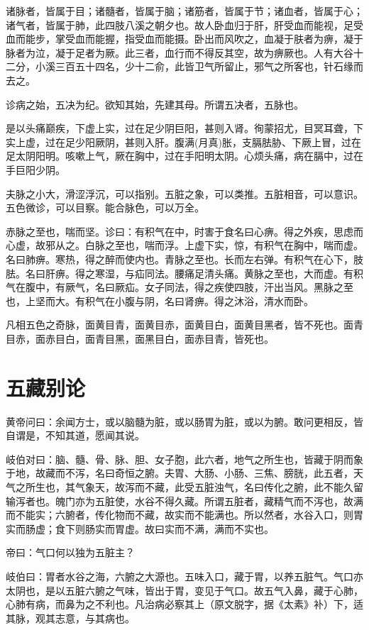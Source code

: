 \documentclass{article}%
\begin{document}
诸脉者，皆属于目；诸髓者，皆属于脑；诸筋者，皆属于节；诸血者，皆属于心；诸气者，皆属于肺，此四肢八溪之朝夕也。故人卧血归于肝，肝受血而能视，足受血而能步，掌受血而能握，指受血而能摄。卧出而风吹之，血凝于肤者为痹，凝于脉者为泣，凝于足者为厥。此三者，血行而不得反其空，故为痹厥也。人有大谷十二分，小溪三百五十四名，少十二俞，此皆卫气所留止，邪气之所客也，针石缘而去之。

诊病之始，五决为纪。欲知其始，先建其母。所谓五决者，五脉也。

是以头痛巅疾，下虚上实，过在足少阴巨阳，甚则入肾。徇蒙招尤，目冥耳聋，下实上虚，过在足少阳厥阴，甚则入肝。腹满(月真)胀，支膈胠胁、下厥上冒，过在足太阴阳明。咳嗽上气，厥在胸中，过在手阳明太阴。心烦头痛，病在膈中，过在手巨阳少阴。

夫脉之小大，滑涩浮沉，可以指别。五脏之象，可以类推。五脏相音，可以意识。五色微诊，可以目察。能合脉色，可以万全。

赤脉之至也，喘而坚。诊曰：有积气在中，时害于食名曰心痹。得之外疾，思虑而心虚，故邪从之。白脉之至也，喘而浮。上虚下实，惊，有积气在胸中，喘而虚。名曰肺痹。寒热，得之醉而使内也。青脉之至也。长而左右弹。有积气在心下，肢胠。名曰肝痹。得之寒湿，与疝同法。腰痛足清头痛。黄脉之至也，大而虚。有积气在腹中，有厥气，名曰厥疝。女子同法，得之疾使四肢，汗出当风。黑脉之至也，上坚而大。有积气在小腹与阴，名曰肾痹。得之沐浴，清水而卧。

凡相五色之奇脉，面黄目青，面黄目赤，面黄目白，面黄目黑者，皆不死也。面青目赤，面赤目白，面青目黑，面黑目白，面赤目青，皆死也。
\section{五藏别论}
黄帝问曰：余闻方士，或以脑髓为脏，或以肠胃为脏，或以为腑。敢问更相反，皆自谓是，不知其道，愿闻其说。

岐伯对曰：脑、髓、骨、脉、胆、女子胞，此六者，地气之所生也，皆藏于阴而象于地，故藏而不泻，名曰奇恒之腑。夫胃、大肠、小肠、三焦、膀胱，此五者，天气之所生也，其气象天，故泻而不藏，此受五脏浊气，名曰传化之腑，此不能久留输泻者也。魄门亦为五脏使，水谷不得久藏。所谓五脏者，藏精气而不泻也，故满而不能实；六腑者，传化物而不藏，故实而不能满也。所以然者，水谷入口，则胃实而肠虚；食下则肠实而胃虚。故曰实而不满，满而不实也。

帝曰：气口何以独为五脏主？

岐伯曰：胃者水谷之海，六腑之大源也。五味入口，藏于胃，以养五脏气。气口亦太阴也，是以五脏六腑之气味，皆出于胃，变见于气口。故五气入鼻，藏于心肺，心肺有病，而鼻为之不利也。凡治病必察其上（原文脱字，据《太素》补）下，适其脉，观其志意，与其病也。
\end{document}
